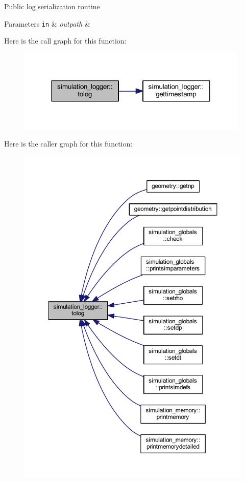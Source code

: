 Public log serialization routine 
\begin{DoxyParams}[1]{Parameters}
\mbox{\tt in}  & {\em outpath} & \\
\hline
\end{DoxyParams}
Here is the call graph for this function\+:
\nopagebreak
\begin{figure}[H]
\begin{center}
\leavevmode
\includegraphics[width=312pt]{namespacesimulation__logger_a3aaa69ec168b6f34d703fb4033a22d92_cgraph}
\end{center}
\end{figure}
Here is the caller graph for this function\+:
\nopagebreak
\begin{figure}[H]
\begin{center}
\leavevmode
\includegraphics[width=350pt]{namespacesimulation__logger_a3aaa69ec168b6f34d703fb4033a22d92_icgraph}
\end{center}
\end{figure}


